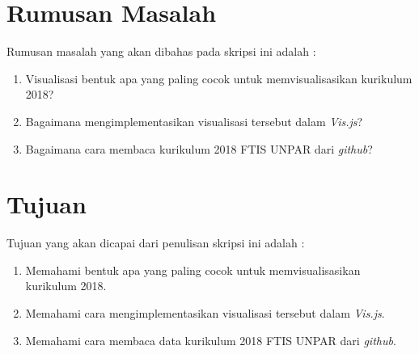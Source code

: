 \newpage
\section{Rumusan Masalah}
\label{sec:rumusan}
Rumusan masalah yang akan dibahas pada skripsi ini adalah :
\begin{comment}
\begin{enumerate}
    \item Bagaimana cara memvisualisasikan kurikulum 2018 dalam bentuk \textit{tree}?
    \item Bagaimana cara memvisualisasikan kurikulum 2018 dalam bentuk \textit{timeline}?
    \item Bagaimana cara membaca kurikulum 2018 FTIS UNPAR dari \textit{github}?
\end{enumerate}
\end{comment}

\begin{enumerate}
    \item Visualisasi bentuk apa yang paling cocok untuk memvisualisasikan kurikulum 2018?
    \item Bagaimana mengimplementasikan visualisasi tersebut dalam \textit{Vis.js}?
    \item Bagaimana cara membaca kurikulum 2018 FTIS UNPAR dari \textit{github}?
\end{enumerate}

\section{Tujuan}
\label{sec:tujuan}
\begin{comment}
Tujuan yang akan dicapai dari penulisan skripsi ini adalah : 
\begin{enumerate}
    \item Memahami cara memvisualisasikan kurikulum 2018 dalam bentuk \textit{tree}.
    \item Memahami cara memvisualisasikan kurikulum 2018 dalam bentuk \textit{timeline}.
    \item Memahami cara membaca data kurikulum 2018 FTIS UNPAR dari \textit{github}.
\end{enumerate}
\end{comment}

Tujuan yang akan dicapai dari penulisan skripsi ini adalah : 
\begin{enumerate}
    \item Memahami bentuk apa yang paling cocok untuk memvisualisasikan kurikulum 2018.
    \item Memahami cara mengimplementasikan visualisasi tersebut dalam \textit{Vis.js}.
    \item Memahami cara membaca data kurikulum 2018 FTIS UNPAR dari \textit{github}.
\end{enumerate}


